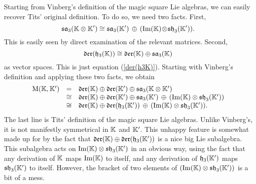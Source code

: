 Starting from Vinberg's definition of the magic square Lie algebras, we
can easily recover Tits' original definition.  To do so, we need two
facts.  First, 
\[  
{\mathfrak {sa}}_3({\mathbb K} \otimes {\mathbb K}') 
\cong {\mathfrak {sa}}_3({\mathbb K}') \, \oplus \, ({\rm Im}({\mathbb K}) \! \otimes \! {\mathfrak {sh}}_3({\mathbb K}')).
\]
This is easily seen by direct examination of the relevant matrices.
Second, 
\[    {\mathfrak {der}}({\mathfrak {h}}_3({\mathbb K})) \cong {\mathfrak {der}}({\mathbb K}) \oplus {\mathfrak {sa}}_3({\mathbb K})  \]
as vector spaces.  This is just equation (\ref{der(h3K)}).  Starting with
Vinberg's definition and applying these two facts, we obtain
\[
\begin{array}{lcl}
{\rm M}({\mathbb K},{\mathbb K}') &=& {\mathfrak {der}}({\mathbb K}) \oplus {\mathfrak {der}}({\mathbb K}') \oplus {\mathfrak {sa}}_3({\mathbb K} \otimes {\mathbb K}') \\
&\cong& {\mathfrak {der}}({\mathbb K}) \oplus {\mathfrak {der}}({\mathbb K}') 
\oplus {\mathfrak {sa}}_3({\mathbb K}') \, \oplus \, ({\rm Im}({\mathbb K}) \otimes {\mathfrak {sh}}_3({\mathbb K}')) \\
&\cong& 
{\mathfrak {der}}({\mathbb K}) \oplus {\mathfrak {der}}({\mathfrak {h}}_3({\mathbb K}')) \, \oplus \, ({\rm Im}({\mathbb K}) \otimes {\mathfrak {sh}}_3({\mathbb K}')) .
\end{array}
\]
The last line is Tits' definition of the magic square Lie algebras.
Unlike Vinberg's, it is not manifestly symmetrical in ${\mathbb K}$ and ${\mathbb K}'$.
This unhappy feature is somewhat made up for by the fact that ${\mathfrak {der}}({\mathbb K})
\oplus {\mathfrak {der}}({\mathfrak {h}}_3({\mathbb K}'))$ is a nice big Lie subalgebra.  This subalgebra
acts on ${\rm Im}({\mathbb K}) \otimes {\mathfrak {sh}}_3({\mathbb K}')$ in an obvious way, using the fact
that any derivation of ${\mathbb K}$ maps ${\rm Im}({\mathbb K})$ to itself, and any derivation
of ${\mathfrak {h}}_3({\mathbb K}')$ maps ${\mathfrak {sh}}_3({\mathbb K}')$ to itself.  However, the bracket of two
elements of $({\rm Im}({\mathbb K}) \otimes {\mathfrak {sh}}_3({\mathbb K}'))$ is a bit of a mess.

